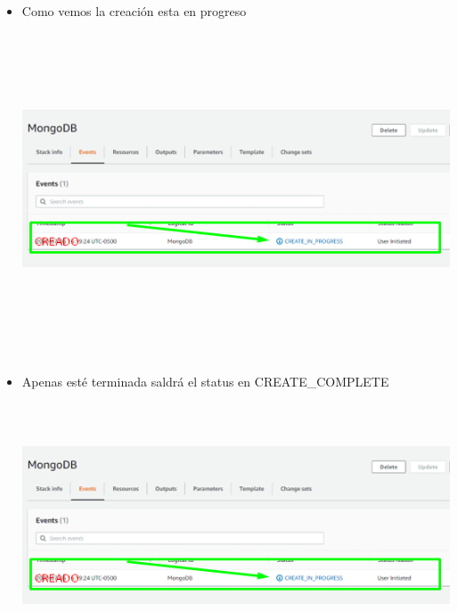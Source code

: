 \documentclass[12pt,a4paper,oneside]{book}
\begin{document}
\newpage
\begin{itemize}
	\item {Como vemos la creación esta en progreso}\\
	
	\includegraphics[width=16cm, height=10cm]{img/18.png}\\
	
	\item {Apenas esté terminada saldrá el status en CREATE\_COMPLETE}\\
	
	\includegraphics[width=16cm, height=8cm]{img/18.png}\\
	
	
	
\end{itemize}





	
\end{document}
